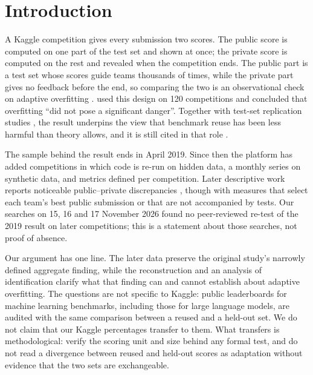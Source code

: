\documentclass[10pt]{article}
\begin{document}
\section{Introduction}

A Kaggle competition gives every submission two scores. The public score is computed on one part of the test set and shown at once; the private score is computed on the rest and revealed when the competition ends. The public part is a test set whose scores guide teams thousands of times, while the private part gives no feedback before the end, so comparing the two is an observational check on adaptive overfitting \citep{dwork2015reusable,blum2015ladder}. \citet{roelofs2019meta} used this design on 120 competitions and concluded that overfitting ``did not pose a significant danger''. Together with test-set replication studies \citep{recht2019imagenet,yadav2019cold}, the result underpins the view that benchmark reuse has been less harmful than theory allows, and it is still cited in that role \citep{sculley2025position}.

The sample behind the result ends in April 2019. Since then the platform has added competitions in which code is re-run on hidden data, a monthly series on synthetic data, and metrics defined per competition. Later descriptive work reports noticeable public--private discrepancies \citep{bonisch2025chronicles,burtch2026monoculture}, though with measures that select each team's best public submission or that are not accompanied by tests. Our searches on 15, 16 and 17 November 2026 found no peer-reviewed re-test of the 2019 result on later competitions; this is a statement about those searches, not proof of absence.

Our argument has one line. The later data preserve the original study's narrowly defined aggregate finding, while the reconstruction and an analysis of identification clarify what that finding can and cannot establish about adaptive overfitting. The questions are not specific to Kaggle: public leaderboards for machine learning benchmarks, including those for large language models, are audited with the same comparison between a reused and a held-out set. We do not claim that our Kaggle percentages transfer to them. What transfers is methodological: verify the scoring unit and size behind any formal test, and do not read a divergence between reused and held-out scores as adaptation without evidence that the two sets are exchangeable.
\end{document}
